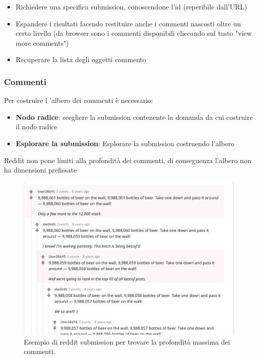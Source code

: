 \begin{itemize}
    \item Richiedere una specifica submission, conoscendone l'id (reperibile dall'URL)
    \item Espandere i risultati facendo restituire anche i commenti nascosti oltre un certo livello (da browser sono i commenti disponibili cliccando sul tasto "view more comments")
    \item Recuperare la lista degli oggetti commento
\end{itemize}

\subsubsection {Commenti}
Per costruire l 'albero dei commenti è necessario:

\begin{itemize}
    \item \textbf{Nodo radice}: scegliere la submission contenente la domanda da cui costruire il nodo radice
    \item \textbf{Esplorare la submission}: Esplorare la submission costruendo l'albero
\end{itemize}

Reddit non pone limiti alla profondità dei commenti, di conseguenza l'albero non ha dimensioni prefissate

\begin{figure}
    \includegraphics[width=\linewidth]{Immagini/reddit-comment-nesting.png}
    \caption{Esempio di reddit submission per trovare la profondità massima dei commenti.}
    \label{fig:reddit-comment-nesting}
\end{figure}


